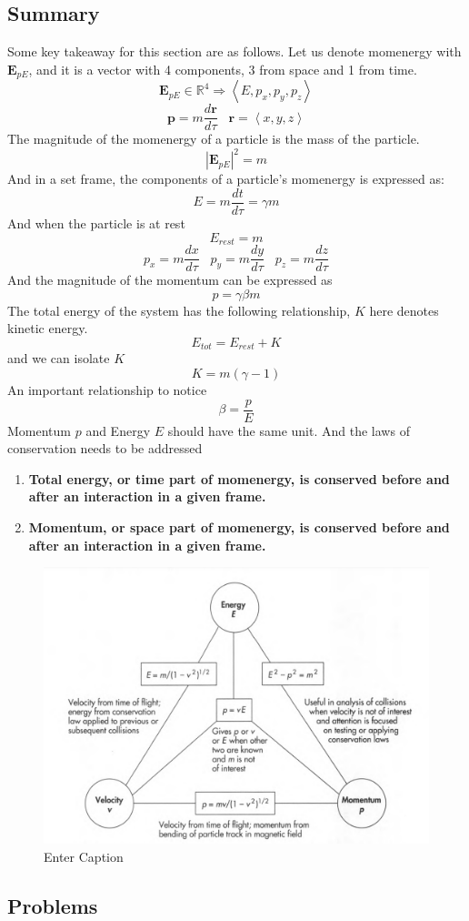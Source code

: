 \documentclass[12pt]{book}
\newcommand{\R}{\mathbb{R}}
\newcommand{\dydx}[2]{\frac{d #1}{d #2}}
\newcommand{\tribkt}[1]{\left< #1 \right>}
\newcommand{\abso}[1]{\left|#1 \right|}
\begin{document}
\subsection{Summary}
Some key takeaway for this section are as follows. Let us denote momenergy with $\textbf{E}_{pE}$, and it is a vector with 4 components, 3 from space and 1 from time. 
\[
\textbf{E}_{pE} \in \R ^4 \Rightarrow \tribkt{E,p_x,p_y,p_z}
\]
\[
\textbf{p} = m\dydx{\textbf{r}}{\tau} \;\;\; \textbf{r} = \tribkt{x,y,z}
\]
The magnitude of the momenergy of a particle is the mass of the particle. 
\[
\abso{\textbf{E}_{pE}}^2 = m
\]
And in a set frame, the components of a particle's momenergy is expressed as:
\[
E = m\dydx{t}{\tau} = \gamma m
\]
And when the particle is at rest
\[
E_{rest} = m
\]
\[
p_x = m\dydx{x}{\tau}\;\;\; p_y = m\dydx{y}{\tau}\;\;\; p_z = m\dydx{z}{\tau}
\]
And the magnitude of the momentum can be expressed as
\[
p = \gamma \beta m
\]
The total energy of the system has the following relationship, $K$ here denotes kinetic energy.
\[
E_{tot}=E_{rest} + K
\]
and we can isolate $K$
\[
K = m(\gamma -1)
\]
An important relationship to notice
\[
\beta = \frac{p}{E}
\]
 Momentum $p$ and Energy $E$ should have the same unit.
\newpage
And the laws of conservation needs to be addressed
\begin{enumerate}
    \item \textbf{Total energy, or time part of momenergy, is conserved before and after an interaction in a given frame.}
    \item \textbf{Momentum, or space part of momenergy, is conserved before and after an interaction in a given frame. }
\end{enumerate}
\begin{figure}[!h]
    \centering
    \includegraphics[width=0.5\linewidth]{picture/Momenergy relationship.png}
    \caption{Enter Caption}
    \label{fig:pEconv}
\end{figure}

\subsection{Problems}
\end{document}
